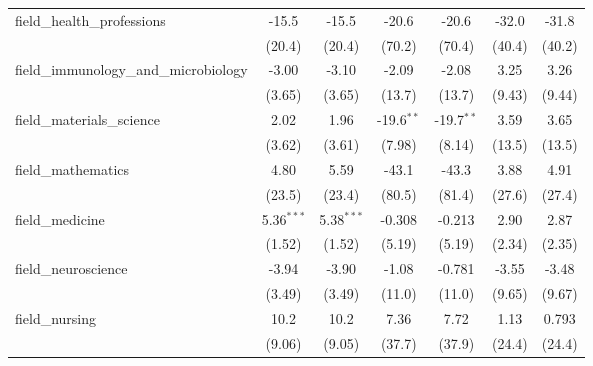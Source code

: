 \begin{tabular}{lcccccc}
   field\_health\_professions                                  & -15.5         & -15.5         & -20.6         & -20.6         & -32.0          & -31.8\\   
                                                               & (20.4)        & (20.4)        & (70.2)        & (70.4)        & (40.4)         & (40.2)\\   
   field\_immunology\_and\_microbiology                        & -3.00         & -3.10         & -2.09         & -2.08         & 3.25           & 3.26\\   
                                                               & (3.65)        & (3.65)        & (13.7)        & (13.7)        & (9.43)         & (9.44)\\   
   field\_materials\_science                                   & 2.02          & 1.96          & -19.6$^{**}$  & -19.7$^{**}$  & 3.59           & 3.65\\   
                                                               & (3.62)        & (3.61)        & (7.98)        & (8.14)        & (13.5)         & (13.5)\\   
   field\_mathematics                                          & 4.80          & 5.59          & -43.1         & -43.3         & 3.88           & 4.91\\   
                                                               & (23.5)        & (23.4)        & (80.5)        & (81.4)        & (27.6)         & (27.4)\\   
   field\_medicine                                             & 5.36$^{***}$  & 5.38$^{***}$  & -0.308        & -0.213        & 2.90           & 2.87\\   
                                                               & (1.52)        & (1.52)        & (5.19)        & (5.19)        & (2.34)         & (2.35)\\   
   field\_neuroscience                                         & -3.94         & -3.90         & -1.08         & -0.781        & -3.55          & -3.48\\   
                                                               & (3.49)        & (3.49)        & (11.0)        & (11.0)        & (9.65)         & (9.67)\\   
   field\_nursing                                              & 10.2          & 10.2          & 7.36          & 7.72          & 1.13           & 0.793\\   
                                                               & (9.06)        & (9.05)        & (37.7)        & (37.9)        & (24.4)         & (24.4)\\   

\end{tabular}
